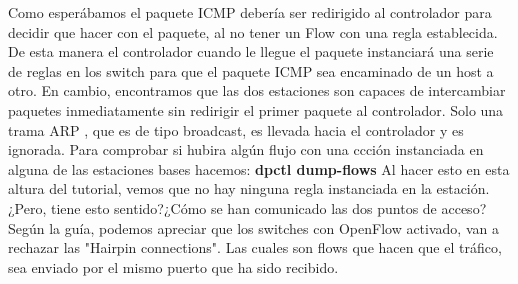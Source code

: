 Como esperábamos el paquete ICMP debería ser redirigido al controlador para decidir que hacer con el paquete, al no tener un Flow con una regla establecida. De esta manera el controlador cuando  le llegue el paquete instanciará una serie de reglas en los switch para que el paquete ICMP sea encaminado de un host a otro. En cambio, encontramos que las dos estaciones son capaces de intercambiar paquetes inmediatamente sin redirigir el primer paquete al controlador. Solo una trama ARP , que es de tipo broadcast, es llevada hacia el controlador y es ignorada.\newline
\newline
Para comprobar si hubira algún flujo con una ccción instanciada en alguna de las estaciones bases hacemos:
\textbf{dpctl dump-flows}
\newline
\newline
Al hacer esto en esta altura del tutorial, vemos que no hay ninguna regla instanciada en la estación. ¿Pero, tiene esto sentido?¿Cómo se han comunicado las dos puntos de acceso?\newline
\newline
Según la guía, podemos apreciar que los switches con OpenFlow activado, van a rechazar las "Hairpin connections". Las cuales son flows que hacen que el tráfico, sea enviado por el mismo puerto que ha sido recibido.

